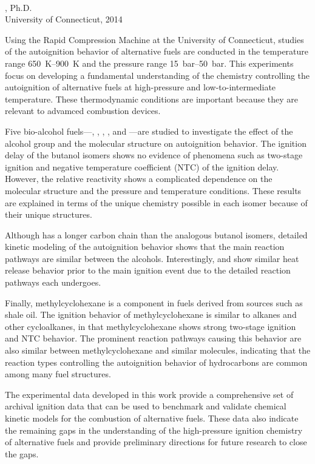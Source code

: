 \documentclass[12pt,letterpaper,oneside,final]{book}
\begin{document}
\thispagestyle{empty}
\begin{center}
\thetitle \\
\theauthor, Ph.D. \\
University of Connecticut, 2014 \\
\blankline
\end{center}
Using the Rapid Compression Machine at the University of Connecticut,
studies of the autoignition behavior of alternative fuels are conducted
in the temperature range \SIrange{650}{900}{\kelvin} and the pressure
range \SIrange{15}{50}{\bar}. This experiments focus on developing a
fundamental understanding of the chemistry controlling the autoignition
of alternative fuels at high-pressure and low-to-intermediate temperature.
These thermodynamic conditions are important because they are relevant to
advamced combustion devices.

Five bio-alcohol fuels---\nBuOH{}, \sBuOH{}, \tBuOH{}, \iBuOH{},
and \iPeOH{}---are studied to investigate the effect of the alcohol group
and the molecular structure on autoignition behavior. The ignition delay of the butanol
isomers shows no evidence of phenomena such as two-stage ignition and
negative temperature coefficient (NTC) of the ignition delay. However, the relative
reactivity shows a complicated dependence on the molecular structure and
the pressure and temperature conditions.
These results are explained in terms of the unique chemistry possible in
each isomer because of their unique structures.

Although \iPeOH{} has a longer carbon chain than the analogous butanol
isomers, detailed kinetic modeling of the autoignition behavior shows
that the main reaction pathways are similar between the alcohols.
Interestingly, \iPeOH{} and \tBuOH{} show similar heat release behavior
prior to the main ignition event due to the detailed reaction pathways
each undergoes.

Finally, methylcyclohexane is a component in fuels derived from sources such as shale oil. The ignition behavior of methylcyclohexane
is similar to alkanes and other cycloalkanes, in that
methylcyclohexane shows strong two-stage ignition and NTC behavior. The prominent reaction pathways causing this behavior
are also similar between methylcyclohexane and similar molecules, indicating that
the reaction types controlling the autoignition behavior of hydrocarbons are
common among many fuel structures.

The experimental data developed in this work provide a comprehensive set
of archival ignition data that can be used to benchmark and validate
chemical kinetic models for the combustion of alternative fuels. These
data also indicate the remaining gaps in the understanding of the
high-pressure ignition chemistry of alternative fuels and provide preliminary
directions for future research to close the gaps.
\end{document}
